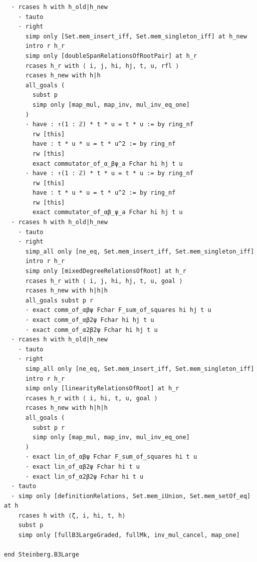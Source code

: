 \documentclass[10pt,a4paper]{article}
\begin{document}
\begin{Verbatim}
  · rcases h with h_old|h_new
    · tauto
    · right
      simp only [Set.mem_insert_iff, Set.mem_singleton_iff] at h_new
      intro r h_r
      simp only [doubleSpanRelationsOfRootPair] at h_r
      rcases h_r with ⟨ i, j, hi, hj, t, u, rfl ⟩
      rcases h_new with h|h
      all_goals (
        subst p
        simp only [map_mul, map_inv, mul_inv_eq_one]
      )
      · have : ↑(1 : ℤ) * t * u = t * u := by ring_nf
        rw [this]
        have : t * u * u = t * u^2 := by ring_nf
        rw [this]
        exact commutator_of_α_βψ_a Fchar hi hj t u
      · have : ↑(1 : ℤ) * t * u = t * u := by ring_nf
        rw [this]
        have : t * u * u = t * u^2 := by ring_nf
        rw [this]
        exact commutator_of_αβ_ψ_a Fchar hi hj t u
  · rcases h with h_old|h_new
    · tauto
    · right
      simp_all only [ne_eq, Set.mem_insert_iff, Set.mem_singleton_iff]
      intro r h_r
      simp only [mixedDegreeRelationsOfRoot] at h_r
      rcases h_r with ⟨ i, j, hi, hj, t, u, goal ⟩
      rcases h_new with h|h|h
      all_goals subst p r
      · exact comm_of_αβψ Fchar F_sum_of_squares hi hj t u
      · exact comm_of_αβ2ψ Fchar hi hj t u
      · exact comm_of_α2β2ψ Fchar hi hj t u
  · rcases h with h_old|h_new
    · tauto
    · right
      simp_all only [ne_eq, Set.mem_insert_iff, Set.mem_singleton_iff]
      intro r h_r
      simp only [linearityRelationsOfRoot] at h_r
      rcases h_r with ⟨ i, hi, t, u, goal ⟩
      rcases h_new with h|h|h
      all_goals (
        subst p r
        simp only [map_mul, map_inv, mul_inv_eq_one]
      )
      · exact lin_of_αβψ Fchar F_sum_of_squares hi t u
      · exact lin_of_αβ2ψ Fchar hi t u
      · exact lin_of_α2β2ψ Fchar hi t u
  · tauto
  · simp only [definitionRelations, Set.mem_iUnion, Set.mem_setOf_eq] at h
    rcases h with ⟨ζ, i, hi, t, h⟩
    subst p
    simp only [fullB3LargeGraded, fullMk, inv_mul_cancel, map_one]

end Steinberg.B3Large
\end{Verbatim}
\end{document}
